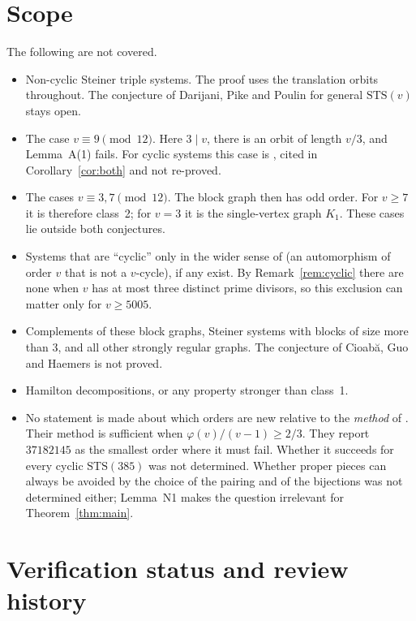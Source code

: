 \documentclass[11pt]{amsart}
\theoremstyle{plain}
\theoremstyle{definition}
\theoremstyle{remark}
\numberwithin{equation}{section}
\newcommand{\STS}{\mathrm{STS}}
\begin{document}
\section{Scope}\label{sec:scope}

The following are not covered.
\begin{itemize}
\item Non-cyclic Steiner triple systems. The proof uses the translation orbits throughout. The conjecture of Darijani, Pike and Poulin for general \(\STS(v)\) stays open.
\item The case \(v\equiv9\pmod{12}\). Here \(3\mid v\), there is an orbit of length \(v/3\), and Lemma~A(1) fails. For cyclic systems this case is \cite[Theorem~4.1]{DPP}, cited in Corollary~\ref{cor:both} and not re-proved.
\item The cases \(v\equiv3,7\pmod{12}\). The block graph then has odd order. For \(v\ge7\) it is therefore class~2; for \(v=3\) it is the single-vertex graph \(K_1\). These cases lie outside both conjectures.
\item Systems that are ``cyclic'' only in the wider sense of \cite{DPP} (an automorphism of order \(v\) that is not a \(v\)-cycle), if any exist. By Remark~\ref{rem:cyclic} there are none when \(v\) has at most three distinct prime divisors, so this exclusion can matter only for \(v\ge5005\).
\item Complements of these block graphs, Steiner systems with blocks of size more than \(3\), and all other strongly regular graphs. The conjecture of Cioab\u{a}, Guo and Haemers is not proved.
\item Hamilton decompositions, or any property stronger than class~1.
\item No statement is made about which orders are new relative to the \emph{method} of \cite{DPP}. Their method is sufficient when \(\varphi(v)/(v-1)\ge2/3\). They report \(37182145\) as the smallest order where it must fail. Whether it succeeds for every cyclic \(\STS(385)\) was not determined. Whether proper pieces can always be avoided by the choice of the pairing and of the bijections was not determined either; Lemma~N1 makes the question irrelevant for Theorem~\ref{thm:main}.
\end{itemize}

\section{Verification status and review history}\label{sec:status}
\end{document}
